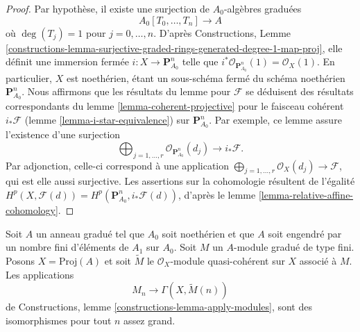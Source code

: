 \begin{proof}
Par hypothèse, il existe une surjection de $A_0$-algèbres graduées
$$
A_0[T_0, \ldots, T_n] \longrightarrow A
$$
où $\deg(T_j) = 1$ pour $j = 0, \ldots, n$. D'après Constructions, Lemme
\ref{constructions-lemma-surjective-graded-rings-generated-degree-1-map-proj},
elle définit une immersion fermée $i : X \to \mathbf{P}^n_{A_0}$
telle que $i^*\mathcal{O}_{\mathbf{P}^n_{A_0}}(1) = \mathcal{O}_X(1)$.
En particulier, $X$ est noethérien, étant un sous-schéma fermé du schéma
noethérien $\mathbf{P}^n_{A_0}$. Nous affirmons que les résultats du lemme pour
$\mathcal{F}$ se déduisent des résultats
correspondants du lemme \ref{lemma-coherent-projective} pour le faisceau cohérent
$i_*\mathcal{F}$ (lemme \ref{lemma-i-star-equivalence}) sur
$\mathbf{P}^n_{A_0}$. Par exemple, ce lemme assure
l'existence d'une surjection
$$
\bigoplus\nolimits_{j = 1, \ldots, r} \mathcal{O}_{\mathbf{P}^n_{A_0}}(d_j)
\longrightarrow i_*\mathcal{F}.
$$
Par adjonction, celle-ci correspond à une application
$\bigoplus_{j = 1, \ldots, r} \mathcal{O}_X(d_j) \longrightarrow \mathcal{F}$,
qui est elle aussi surjective. Les assertions sur la cohomologie résultent
de l'égalité
$H^p(X, \mathcal{F}(d)) = H^p(\mathbf{P}^n_{A_0}, i_*\mathcal{F}(d))$,
d'après le lemme \ref{lemma-relative-affine-cohomology}.
\end{proof}

\begin{lemma}
\label{lemma-recover-tail-graded-module}
Soit $A$ un anneau gradué tel que $A_0$ soit noethérien et que $A$ soit engendré
par un nombre fini d'éléments de $A_1$ sur $A_0$. Soit $M$
un $A$-module gradué de type fini. Posons $X = \text{Proj}(A)$ et soit $\widetilde{M}$
le $\mathcal{O}_X$-module quasi-cohérent sur $X$ associé à $M$.
Les applications
$$
M_n \longrightarrow \Gamma(X, \widetilde{M}(n))
$$
de Constructions, lemme \ref{constructions-lemma-apply-modules},
sont des isomorphismes pour tout $n$ assez grand.
\end{lemma}


